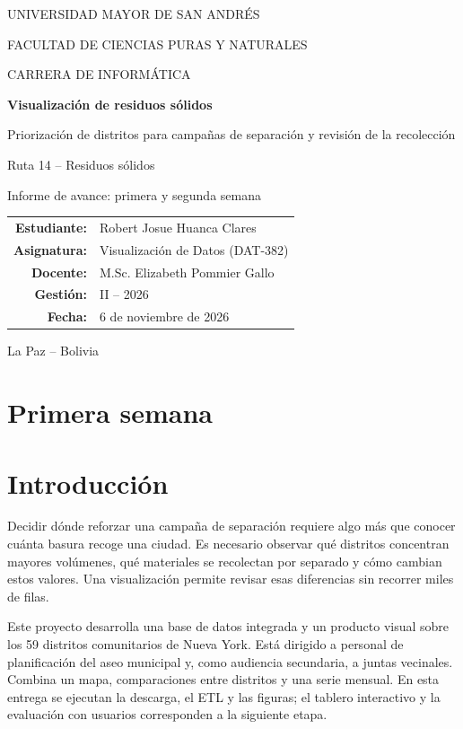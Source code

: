 \documentclass[10pt,a4paper]{article}
\begin{document}
\hypersetup{pageanchor=false}
\begin{titlepage}
\centering
{\large UNIVERSIDAD MAYOR DE SAN ANDRÉS\par}
{FACULTAD DE CIENCIAS PURAS Y NATURALES\par}
{CARRERA DE INFORMÁTICA\par}
\vspace{2.6cm}
{\color{blue!35!black}\LARGE\bfseries Visualización de residuos sólidos\par}
\vspace{.5cm}
{\Large Priorización de distritos para campañas de separación y revisión de la recolección\par}
\vspace{.7cm}
{\large Ruta 14 -- Residuos sólidos\par}
{Informe de avance: primera y segunda semana\par}
\vspace{2cm}
\begin{tabular}{rl}
\textbf{Estudiante:} & Robert Josue Huanca Clares \\
\textbf{Asignatura:} & Visualización de Datos (DAT-382) \\
\textbf{Docente:} & M.Sc. Elizabeth Pommier Gallo \\
\textbf{Gestión:} & II -- 2026 \\
\textbf{Fecha:} & 6 de noviembre de 2026
\end{tabular}
\vfill
{La Paz -- Bolivia\par}
\end{titlepage}
\hypersetup{pageanchor=true}

\section*{Primera semana}
\section{Introducción}
Decidir dónde reforzar una campaña de separación requiere algo más que conocer cuánta basura recoge una ciudad. Es necesario observar qué distritos concentran mayores volúmenes, qué materiales se recolectan por separado y cómo cambian estos valores. Una visualización permite revisar esas diferencias sin recorrer miles de filas.

Este proyecto desarrolla una base de datos integrada y un producto visual sobre los 59 distritos comunitarios de Nueva York. Está dirigido a personal de planificación del aseo municipal y, como audiencia secundaria, a juntas vecinales. Combina un mapa, comparaciones entre distritos y una serie mensual. En esta entrega se ejecutan la descarga, el ETL y las figuras; el tablero interactivo y la evaluación con usuarios corresponden a la siguiente etapa.
\end{document}
